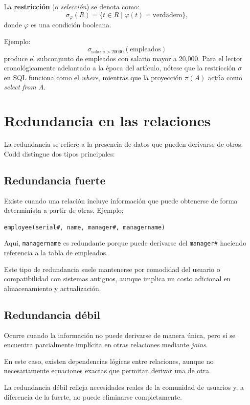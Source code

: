 \documentclass{article}
\begin{document}
La \textbf{restricción} (o \textit{selección}) se denota como:
\[
\sigma_{\varphi}(R) = \{ t \in R \mid \varphi(t) = \text{verdadero} \},
\]
donde $\varphi$ es una condición booleana.  

Ejemplo: 
\[
\sigma_{\text{salario} > 20000}(\text{empleados})
\]
produce el subconjunto de empleados con salario mayor a 20,000. Para el lector cronológicamente adelantado a la época del artículo, nótese que la restricción $\sigma$ en SQL funciona como el \textit{where}, mientras que la proyección $\pi(A)$ actúa como \textit{select from A}.


\section{Redundancia en las relaciones}

La redundancia se refiere a la presencia de datos que pueden derivarse de otros. Codd distingue dos tipos principales:

\subsection{Redundancia fuerte}

Existe cuando una relación incluye información que puede obtenerse de forma determinista a partir de otras.  
Ejemplo:

\texttt{employee(serial\#, name, manager\#, managername)}

Aquí, \texttt{managername} es redundante porque puede derivarse del \texttt{manager\#} haciendo referencia a la tabla de empleados.

Este tipo de redundancia suele mantenerse por comodidad del usuario o compatibilidad con sistemas antiguos, aunque implica un costo adicional en almacenamiento y actualización.

\subsection{Redundancia débil}

Ocurre cuando la información no puede derivarse de manera única, pero sí se encuentra parcialmente implícita en otras relaciones mediante \textit{joins}.  

En este caso, existen dependencias lógicas entre relaciones, aunque no necesariamente ecuaciones exactas que permitan derivar una de otra.

La redundancia débil refleja necesidades reales de la comunidad de usuarios y, a diferencia de la fuerte, no puede eliminarse completamente.
\end{document}
